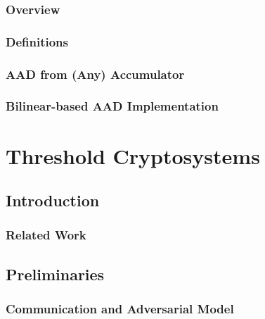 \documentclass[12pt,twoside,singlespace]{mitthesis}
\begin{document}
        \section{Overview}
        \label{s:aad:intro}
        
        
        \section{Definitions}
        \label{s:aad:defs}
        
       
        \section{AAD from (Any) Accumulator}
        \label{s:aad:from-acc}
        
        
        \section{Bilinear-based AAD Implementation}
        \label{s:aad:from-bilinear-acc:eval}
        
%
%
\part{Threshold Cryptosystems}
\label{s:threshcrypto}

    
    \chapter{Introduction}
    \label{s:threshcrypto:intro}
    
        
        \section{Related Work}
        \label{s:threshcrypto:related-work}
        

    \chapter{Preliminaries}
    \label{s:prelim:threshcrypto}
    
        \section{Communication and Adversarial Model}
        
        
\end{document}
